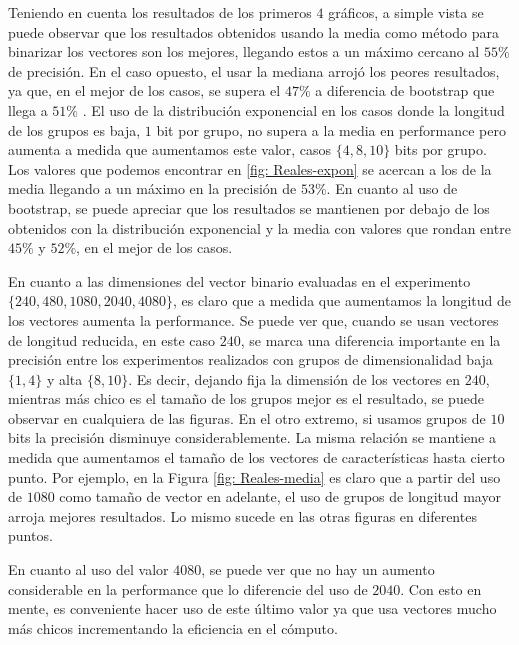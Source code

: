 	Teniendo en cuenta los resultados de los primeros $4$ gráficos, a simple vista se puede observar que los resultados obtenidos usando la media como método para binarizar los vectores son los mejores, llegando estos a un máximo cercano al $55\%$ de precisión. En el caso opuesto, el usar la mediana arrojó los peores resultados, ya que, en el mejor de los casos, se supera el $47\%$ a diferencia de bootstrap que llega a $51\%$ . El uso de la distribución exponencial en los casos donde la longitud de los grupos es baja, $1$ bit por grupo, no supera a la media en performance pero aumenta a medida que aumentamos este valor, casos $\{ 4, 8, 10\}$ bits por grupo. Los valores que podemos encontrar en \ref{fig: Reales-expon} se acercan a los de la media llegando a un máximo en la precisión de $53\%$. En cuanto al uso de bootstrap, se puede apreciar que los resultados se mantienen por debajo de los obtenidos con la distribución exponencial y la media con valores que rondan entre $45\%$ y $52\%$, en el mejor de los casos.

	En cuanto a las dimensiones del vector binario evaluadas en el experimento $\{ 240, 480, 1080, 2040, 4080 \}$, es claro que a medida que aumentamos la longitud de los vectores aumenta la performance. Se puede ver que, cuando se usan vectores de longitud reducida, en este caso $240$, se marca una diferencia importante en la precisión entre los experimentos realizados con grupos de dimensionalidad baja $\{ 1, 4 \}$ y alta $\{8, 10\}$. Es decir, dejando fija la dimensión de los vectores en $240$, mientras más chico es el tamaño de los grupos mejor es el resultado, se puede observar en cualquiera de las figuras. En el otro extremo, si usamos grupos de $10$ bits la precisión disminuye considerablemente. La misma relación se mantiene a medida que aumentamos el tamaño de los vectores de características hasta cierto punto. Por ejemplo, en la Figura \ref{fig: Reales-media} es claro que a partir del uso de $1080$ como tamaño de vector en adelante, el uso de grupos de longitud mayor arroja mejores resultados. Lo mismo sucede en las otras figuras en diferentes puntos.

	En cuanto al uso del valor $4080$, se puede ver que no hay un aumento considerable en la performance que lo diferencie del uso de $2040$. Con esto en mente, es conveniente hacer uso de este último valor ya que usa vectores mucho más chicos incrementando la eficiencia en el cómputo.

